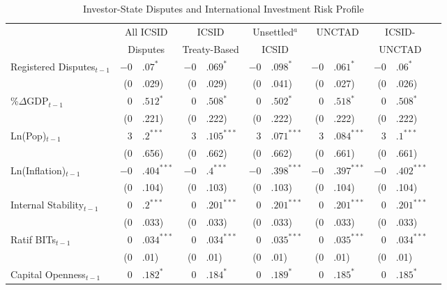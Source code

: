 \documentclass[12pt,onesided]{amsart}
\begin{document}
\begin{savenotes}
\begin{table}[ht]
\vspace{3cm}
\centering
\caption{Investor-State Disputes and International Investment Risk Profile}
\label{tab:dispRepLevel}
\begin{tabular}{lr@{} lr@{}lr@{}lr@{}lr@{}lr@{}}
  \hline\hline
  & \multicolumn{2}{c}{All ICSID} & \multicolumn{2}{c}{ICSID} & \multicolumn{2}{c}{Unsettled$^{a}$} & \multicolumn{2}{c}{\multirow{2}{*}{UNCTAD}} & \multicolumn{2}{c}{ICSID-} \\ 
  & \multicolumn{2}{c}{Disputes} & \multicolumn{2}{c}{Treaty-Based} & \multicolumn{2}{c}{ICSID} & && \multicolumn{2}{c}{UNCTAD} \\
 \hline
Registered Disputes$_{t-1}$ & $-0$&$.07^{\ast}$ & $-0$&$.069^{\ast}$ & $-0$&$.098^{\ast}$ & $-0$&$.061^{\ast}$ & $-0$&$.06^{\ast}$ \\ 
   & (0&.029) & (0&.029) & (0&.041) & (0&.027) & (0&.026) \\ 
  \%$\Delta$GDP$_{t-1}$ & $0$&$.512^{\ast}$ & $0$&$.508^{\ast}$ & $0$&$.502^{\ast}$ & $0$&$.518^{\ast}$ & $0$&$.508^{\ast}$ \\ 
   & (0&.221) & (0&.222) & (0&.222) & (0&.222) & (0&.222) \\ 
  Ln(Pop)$_{t-1}$ & $3$&$.2^{\ast\ast\ast}$ & $3$&$.105^{\ast\ast\ast}$ & $3$&$.071^{\ast\ast\ast}$ & $3$&$.084^{\ast\ast\ast}$ & $3$&$.1^{\ast\ast\ast}$ \\ 
   & (0&.656) & (0&.662) & (0&.662) & (0&.661) & (0&.661) \\ 
  Ln(Inflation)$_{t-1}$ & $-0$&$.404^{\ast\ast\ast}$ & $-0$&$.4^{\ast\ast\ast}$ & $-0$&$.398^{\ast\ast\ast}$ & $-0$&$.397^{\ast\ast\ast}$ & $-0$&$.402^{\ast\ast\ast}$ \\ 
   & (0&.104) & (0&.103) & (0&.103) & (0&.104) & (0&.104) \\ 
  Internal Stability$_{t-1}$ & $0$&$.2^{\ast\ast\ast}$ & $0$&$.201^{\ast\ast\ast}$ & $0$&$.201^{\ast\ast\ast}$ & $0$&$.201^{\ast\ast\ast}$ & $0$&$.201^{\ast\ast\ast}$ \\ 
   & (0&.033) & (0&.033) & (0&.033) & (0&.033) & (0&.033) \\ 
  Ratif BITs$_{t-1}$ & $0$&$.034^{\ast\ast\ast}$ & $0$&$.034^{\ast\ast\ast}$ & $0$&$.035^{\ast\ast\ast}$ & $0$&$.035^{\ast\ast\ast}$ & $0$&$.034^{\ast\ast\ast}$ \\ 
   & (0&.01) & (0&.01) & (0&.01) & (0&.01) & (0&.01) \\ 
  Capital Openness$_{t-1}$ & $0$&$.182^{\ast}$ & $0$&$.184^{\ast}$ & $0$&$.189^{\ast}$ & $0$&$.185^{\ast}$ & $0$&$.185^{\ast}$ \\ 

\end{tabular}
\end{table}
\end{savenotes}
\end{document}
